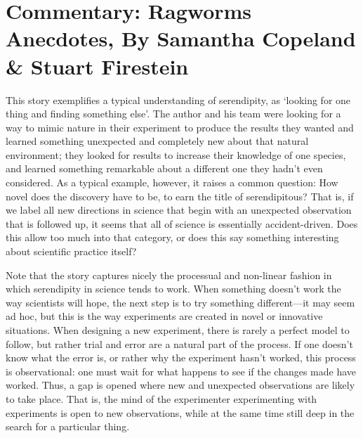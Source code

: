 \documentclass[authordate, empirical]{jote-new-article}
\author[1]{\mbox{Samantha Copeland\orcid{0000-0002-6946-7165}}}
\affil[1]{Delft University of Technology}
\author[2]{\mbox{Stuart Firestein\orcid{0000-0003-1774-5853}}}
\affil[2]{Columbia University}
\begin{document}
\begin{frontmatter}
  \maketitle
  \begin{abstract}
    \printabstracttext
  \end{abstract}
\end{frontmatter}


	\section{Commentary: Ragworms Anecdotes, By Samantha Copeland \& Stuart Firestein}



	This story exemplifies a typical understanding of serendipity, as ‘looking for one thing and finding something else'. The author and his team were looking for a way to mimic nature in their experiment to produce the results they wanted and learned something unexpected and completely new about that natural environment; they looked for results to increase their knowledge of one species, and learned something remarkable about a different one they hadn't even considered. As a typical example, however, it raises a common question: How novel does the discovery have to be, to earn the title of serendipitous? That is, if we label all new directions in science that begin with an unexpected observation that is followed up, it seems that all of science is essentially accident-driven. Does this allow too much into that category, or does this say something interesting about scientific practice itself?



	Note that the story captures nicely the processual and non-linear fashion in which serendipity in science tends to work. When something doesn't work the way scientists will hope, the next step is to try something different—it may seem ad hoc, but this is the way experiments are created in novel or innovative situations. When designing a new experiment, there is rarely a perfect model to follow, but rather trial and error are a natural part of the process. If one doesn't know what the error is, or rather why the experiment hasn't worked, this process is observational: one must wait for what happens to see if the changes made have worked. Thus, a gap is opened where new and unexpected observations are likely to take place. That is, the mind of the experimenter experimenting with experiments is open to new observations, while at the same time still deep in the search for a particular thing.
\end{document}

